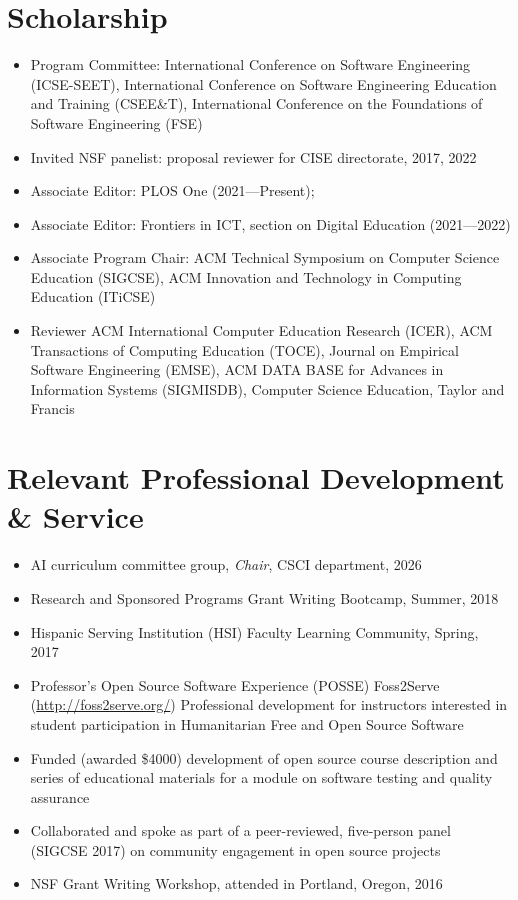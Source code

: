 \documentclass[10pt,letterpaper]{article}
\begin{document}
\section*{Scholarship}
\begin{itemize}[leftmargin=1.25em]
\item Program Committee: International Conference on Software Engineering (ICSE-SEET), International Conference on Software Engineering Education and Training (CSEE\&T), International Conference on the Foundations of Software Engineering (FSE)
\item Invited NSF panelist: proposal reviewer for CISE directorate, 2017, 2022
\item Associate Editor: PLOS One (2021---Present);
\item Associate Editor: Frontiers in ICT, section on Digital Education (2021---2022)
\item Associate Program Chair: ACM Technical Symposium on Computer Science Education (SIGCSE), ACM Innovation and Technology in Computing Education (ITiCSE)
\item Reviewer ACM International Computer Education Research (ICER), ACM Transactions of Computing Education (TOCE), Journal on Empirical Software Engineering (EMSE), ACM DATA BASE for Advances in Information Systems (SIGMISDB), Computer Science Education, Taylor and Francis
\end{itemize}
\section*{Relevant Professional Development \& Service}
\begin{itemize}[leftmargin=1.5em]
    \item AI curriculum committee group, \textit{Chair}, CSCI department, 2026
    \item Research and Sponsored Programs Grant Writing Bootcamp, Summer, 2018
    \item Hispanic Serving Institution (HSI) Faculty Learning Community, Spring, 2017
    \item Professor's Open Source Software Experience (POSSE) Foss2Serve (\url{http://foss2serve.org/}) Professional development for instructors interested in student participation in Humanitarian Free and Open Source Software
    \item Funded (awarded \$4000) development of open source course description and series of educational materials for a module on software testing and quality assurance
    \item Collaborated and spoke as part of a peer-reviewed, five-person panel (SIGCSE 2017) on community engagement in open source projects
    \item NSF Grant Writing Workshop, attended in Portland, Oregon, 2016
\end{itemize}
\end{document}
